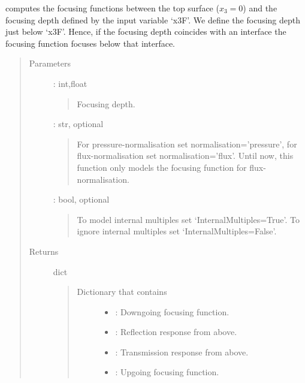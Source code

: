 \documentclass[letterpaper,10pt,english]{sphinxmanual}
\begin{document}
\begin{fulllineitems}
\begin{fulllineitems}
\label{\detokenize{Layered_NRM_p_w:Layered_NRM_p_w.Layered_NRM_p_w.FocusingFunction_p_w}}
computes the focusing functions between the top surface (\(x_3=0\)) and the focusing depth defined by the input variable ‘x3F’. We define the focusing depth just below ‘x3F’. Hence, if the focusing depth coincides with an interface the focusing function focuses below that interface.
\begin{quote}\begin{description}
\item[{Parameters}] \leavevmode
{} : int,float
\begin{quote}

Focusing depth.
\end{quote}

 : str, optional
\begin{quote}

For pressure-normalisation set normalisation=’pressure’, for flux-normalisation set normalisation=’flux’. Until now, this function only models the focusing function for flux-normalisation.
\end{quote}

 : bool, optional
\begin{quote}

To model internal multiples set ‘InternalMultiples=True’. To ignore internal multiples set ‘InternalMultiples=False’.
\end{quote}

\item[{Returns}] \leavevmode
dict
\begin{quote}
\begin{description}
\item[{Dictionary that contains }] \leavevmode\begin{itemize}
\item {} 
: Downgoing focusing function.

\item {} 
: Reflection response from above.

\item {} 
: Transmission response from above.

\item {} 
: Upgoing focusing function.


\end{itemize}
\end{description}
\end{quote}
\end{description}
\end{quote}
\end{fulllineitems}
\end{fulllineitems}
\end{document}
